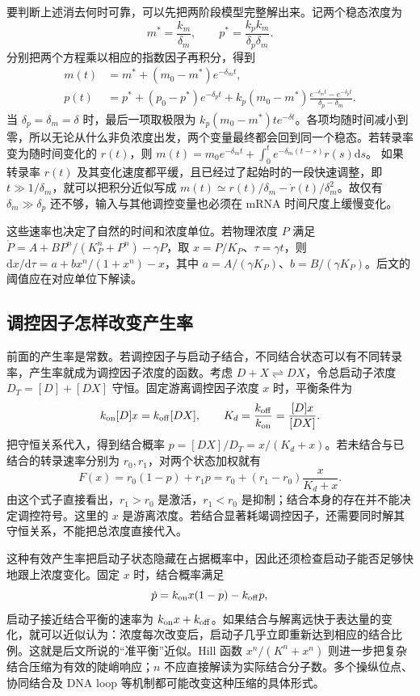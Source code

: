 \documentclass[11pt,a4paper,UTF8,fontset=fandol]{ctexart}
\newcommand{\dd}{\mathrm d}\newcommand{\R}{\mathbb R}\newcommand{\ssv}{\mathrm{ss}}
\begin{document}
要判断上述消去何时可靠，可以先把两阶段模型完整解出来。记两个稳态浓度为
\[
m^*=\frac{k_m}{\delta_m},\qquad p^*=\frac{k_pk_m}{\delta_p\delta_m}.
\]
分别把两个方程乘以相应的指数因子再积分，得到
\begin{align}
m(t)&=m^*+(m_0-m^*)e^{-\delta_mt},\\
p(t)&=p^*+(p_0-p^*)e^{-\delta_pt}
 +k_p(m_0-m^*)\frac{e^{-\delta_mt}-e^{-\delta_pt}}{\delta_p-\delta_m}.
\end{align}
当 $\delta_p=\delta_m=\delta$ 时，最后一项取极限为 $k_p(m_0-m^*)te^{-\delta t}$。各项均随时间减小到零，所以无论从什么非负浓度出发，两个变量最终都会回到同一个稳态。若转录率变为随时间变化的 $r(t)$，则
$m(t)=m_0e^{-\delta_mt}+\int_0^t e^{-\delta_m(t-s)}r(s)\dd s$。
如果转录率 $r(t)$ 及其变化速度都平缓，且已经过了起始时的一段快速调整，即 $t\gg1/\delta_m$，就可以把积分近似写成
$m(t)\simeq r(t)/\delta_m-\dot r(t)/\delta_m^2$。故仅有 $\delta_m\gg\delta_p$ 还不够，输入与其他调控变量也必须在 mRNA 时间尺度上缓慢变化。

这些速率也决定了自然的时间和浓度单位。若物理浓度 $P$ 满足 $\dot P=A+B P^n/(K_P^n+P^n)-\gamma P$，取 $x=P/K_P$、$\tau=\gamma t$，则
$\dd x/\dd\tau=a+b x^n/(1+x^n)-x$，其中 $a=A/(\gamma K_P)$、$b=B/(\gamma K_P)$。后文的阈值应在对应单位下解读。

\subsection{调控因子怎样改变产生率}
前面的产生率是常数。若调控因子与启动子结合，不同结合状态可以有不同转录率，产生率就成为调控因子浓度的函数。考虑 $D+X\rightleftharpoons DX$，令总启动子浓度 $D_T=[D]+[DX]$ 守恒。固定游离调控因子浓度 $x$ 时，平衡条件为
\[
k_{\rm on}[D]x=k_{\rm off}[DX],\qquad K_d=\frac{k_{\rm off}}{k_{\rm on}}=\frac{[D]x}{[DX]}.
\]
把守恒关系代入，得到结合概率 $p=[DX]/D_T=x/(K_d+x)$。若未结合与已结合的转录速率分别为 $r_0,r_1$，对两个状态加权就有
\begin{equation}F(x)=r_0(1-p)+r_1p=r_0+(r_1-r_0)\frac{x}{K_d+x}.\label{eq:occupancy}\end{equation}
由这个式子直接看出，$r_1>r_0$ 是激活，$r_1<r_0$ 是抑制；结合本身的存在并不能决定调控符号。这里的 $x$ 是游离浓度。若结合显著耗竭调控因子，还需要同时解其守恒关系，不能把总浓度直接代入。

这种有效产生率把启动子状态隐藏在占据概率中，因此还须检查启动子能否足够快地跟上浓度变化。固定 $x$ 时，结合概率满足
\[
\dot p=k_{\rm on}x(1-p)-k_{\rm off}p,
\]
启动子接近结合平衡的速率为 $k_{\rm on}x+k_{\rm off}$。如果结合与解离远快于表达量的变化，就可以近似认为：浓度每次改变后，启动子几乎立即重新达到相应的结合比例。这就是后文所说的“准平衡”近似。Hill 函数 $x^n/(K^n+x^n)$ 则进一步把复杂结合压缩为有效的陡峭响应；$n$ 不应直接解读为实际结合分子数。多个操纵位点、协同结合及 DNA loop 等机制都可能改变这种压缩的具体形式。
\end{document}
